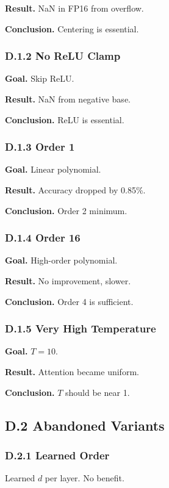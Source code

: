 \textbf{Result.} NaN in FP16 from overflow.

\textbf{Conclusion.} Centering is essential.

\subsubsection{D.1.2 No ReLU Clamp}

\textbf{Goal.} Skip ReLU.

\textbf{Result.} NaN from negative base.

\textbf{Conclusion.} ReLU is essential.

\subsubsection{D.1.3 Order 1}

\textbf{Goal.} Linear polynomial.

\textbf{Result.} Accuracy dropped by 0.85\%.

\textbf{Conclusion.} Order 2 minimum.

\subsubsection{D.1.4 Order 16}

\textbf{Goal.} High-order polynomial.

\textbf{Result.} No improvement, slower.

\textbf{Conclusion.} Order 4 is sufficient.

\subsubsection{D.1.5 Very High Temperature}

\textbf{Goal.} $T = 10$.

\textbf{Result.} Attention became uniform.

\textbf{Conclusion.} $T$ should be near 1.

\subsection{D.2 Abandoned Variants}

\subsubsection{D.2.1 Learned Order}

Learned $d$ per layer. No benefit.

